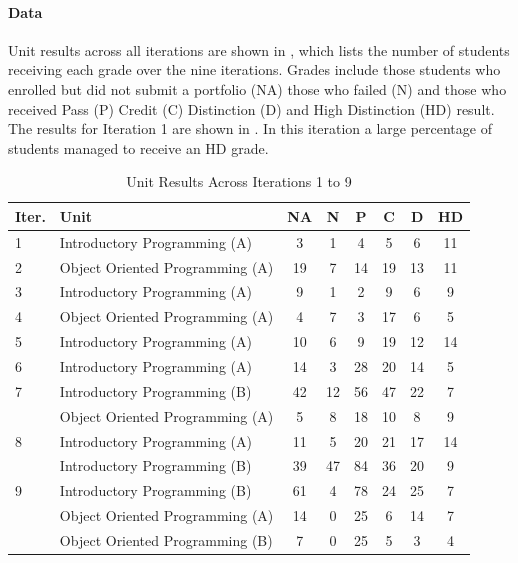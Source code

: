\paragraph{Data} %

Unit results across all iterations are shown in , which lists the number of students receiving each grade over the nine iterations. Grades include those students who enrolled but did not submit a portfolio (NA) those who failed (N) and those who received Pass (P) Credit (C) Distinction (D) and High Distinction (HD) result. The results for Iteration 1 are shown in . In this iteration a large percentage of students managed to receive an HD grade.

\begin{table}[p]
  \footnotesize
  \renewcommand{\arraystretch}{1.3}
  \caption{Unit Results Across Iterations 1 to 9}
  \label{tbl:unit_results}
  \centering
    \begin{tabular}{l|l|c|c|c|c|c|c}
        Iter. & Unit    & NA & N  & P  & C  & D  & HD \\ \hline
        1         & Introductory Programming (A)  & 3  & 1  & 4  & 5  & 6  & 11 \\ \hline
        2         & Object Oriented Programming (A) & 19 & 7  & 14 & 19 & 13 & 11 \\ \hline
        3         & Introductory Programming (A)  & 9  & 1  & 2  & 9  & 6  & 9  \\ \hline
        4         & Object Oriented Programming (A) & 4  & 7  & 3  & 17 & 6  & 5  \\ \hline
        5         & Introductory Programming (A)  & 10 & 6  & 9  & 19 & 12 & 14 \\ \hline
        6         & Introductory Programming (A)  & 14 & 3  & 28 & 20 & 14 & 5  \\ \hline
        7         & Introductory Programming (B)  & 42 & 12 & 56 & 47 & 22 & 7  \\ 
        ~         & Object Oriented Programming (A) & 5  & 8  & 18 & 10 & 8  & 9  \\ \hline
        8         & Introductory Programming (A)  & 11 & 5  & 20 & 21 & 17 & 14 \\ 
        ~         & Introductory Programming (B)  & 39 & 47 & 84 & 36 & 20 & 9  \\ \hline
        9         & Introductory Programming (B)  & 61 & 4  & 78 & 24 & 25 & 7  \\ 
        ~         & Object Oriented Programming (A) & 14 & 0  & 25 & 6  & 14 & 7  \\ 
        ~         & Object Oriented Programming (B) & 7  & 0  & 25 & 5  & 3  & 4  
    \end{tabular}
\end{table}

